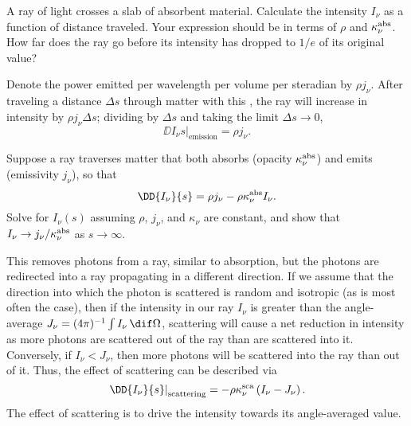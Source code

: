 \begin{exercisebox}
\label{ex.attenuation-light}
A ray of light crosses a slab of absorbent material. Calculate the intensity $I_{\nu}$ as a function of distance traveled. Your expression should be in terms of $\rho$ and $\kappa_\nu^{\mathrm{abs}}$. How far does the ray go before its intensity has dropped to $1/e$ of its original value?
\end{exercisebox}

 Denote the power emitted per wavelength per volume per steradian by $\rho j_{\nu}$. After traveling a distance $\Delta s$ through matter with this , the ray will increase in intensity by $\rho j_{\nu}\Delta s$; dividing by $\Delta s$ and taking the limit $\Delta s\to0$,
\begin{equation}\label{e.emission-microscopic}
\left.\DD{I_{\nu}}{s}\right|_{\mathrm{emission}} = \rho j_{\nu}.
\end{equation}

\begin{exercisebox}
Suppose a ray traverses matter that both absorbs (opacity $\kappa_\nu^{\mathrm{abs}}$) and emits (emissivity $j_{\nu}$), so that
\[	\DD{I_{\nu}}{s} = \rho j_{\nu} - \rho\kapabs I_{\nu}. \]
Solve for $I_{\nu}(s)$ assuming $\rho$, $j_{\nu}$, and $\kappa_{\nu}$ are constant, and show that $I_{\nu}\to j_{\nu}/\kappa_\nu^{\mathrm{abs}}$ as $s\to\infty$.
\label{ex.intensity-at-large-depth}
\end{exercisebox}

 This removes photons from a ray, similar to absorption, but the photons are redirected into a ray propagating in a different direction. 
If we assume that the direction into which the photon is scattered is random and isotropic (as is most often the case), then if the intensity in our ray $I_{\nu}$ is greater than the angle-average $J_{\nu} = (4\pi)^{-1}\int I_{\nu}\,\dif\Omega$, scattering will cause a net reduction in intensity as more photons are scattered out of the ray than are scattered into it. Conversely, if $I_{\nu} < J_{\nu}$, then more photons will be scattered into the ray than out of it. Thus, the effect of scattering can be described via
\begin{equation}\label{e.scattering-microscopic}
\left.\DD{I_{\nu}}{s}\right|_{\mathrm{scattering}} = -\rho\kapscat \left(I_{\nu} - J_{\nu}\right).
\end{equation}
The effect of scattering is to drive the intensity towards its angle-averaged value.

